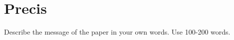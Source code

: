 \documentclass{article}
\begin{document}

\section{Precis}
Describe the message of the paper in your own words. Use 100-200
words. \\
\boxed{}
\end{document}
